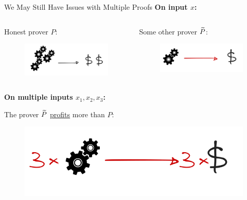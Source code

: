 \begin{frame}[t]{We May Still Have Issues with Multiple Proofs}
\large{\textbf{On input $x$:}}
\begin{columns}
\begin{block}{Honest prover $P$:}
	\begin{figure}
		\includegraphics[scale=0.18]{pics/honest-rew.png}
	\end{figure}
\end{block}
\bigskip
\begin{block}{Some other prover $\widetilde{P}$:}
	\begin{figure}
		\includegraphics[scale=0.18]{pics/dishonest-rew-one.png}
	\end{figure}
\end{block}
\end{columns}
\large{\textbf{On multiple inputs $x_1, x_2, x_3$:}}
\begin{block}{The prover $\widetilde{P}$ \underline{profits} more than $P$:}
	\begin{figure}
		\includegraphics[scale=0.18]{pics/dishonest-rew-many.png}
	\end{figure}
\end{block}

\end{frame}

